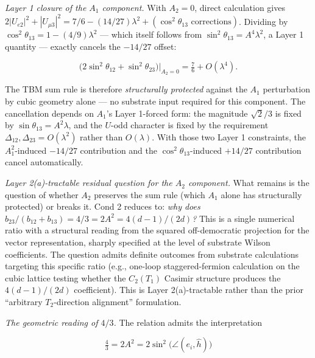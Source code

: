 \documentclass[
]{article}
\begin{document}
\emph{Layer 1 closure of the \(A_1\) component.} With \(A_2 = 0\),
direct calculation gives
\(2|U_{e2}|^2 + |U_{\mu 3}|^2 = 7/6 - (14/27)\lambda^2 + (\cos^2\theta_{13}\text{ corrections})\).
Dividing by \(\cos^2\theta_{13} = 1 - (4/9)\lambda^2\) --- which itself
follows from \(\sin^2\theta_{13} = A^4\lambda^2\), a Layer 1 quantity
--- exactly cancels the \(-14/27\) offset:

\[\bigl(2\sin^2\theta_{12} + \sin^2\theta_{23}\bigr)\big|_{A_2=0} = \tfrac{7}{6} + O(\lambda^4).\]

The TBM sum rule is therefore \emph{structurally protected} against the
\(A_1\) perturbation by cubic geometry alone --- no substrate input
required for this component. The cancellation depends on \(A_1\)'s Layer
1-forced form: the magnitude \(\sqrt{2}/3\) is fixed by
\(\sin\theta_{13} = A^2\lambda\), and the \(U\)-odd character is fixed
by the requirement \(\Delta_{12}, \Delta_{23} = O(\lambda^2)\) rather
than \(O(\lambda)\). With those two Layer 1 constraints, the
\(A_1^2\)-induced \(-14/27\) contribution and the
\(\cos^2\theta_{13}\)-induced \(+14/27\) contribution cancel
automatically.

\emph{Layer 2(a)-tractable residual question for the \(A_2\) component.}
What remains is the question of whether \(A_2\) preserves the sum rule
(which \(A_1\) alone has structurally protected) or breaks it. Cond 2
reduces to: \emph{why does
\(b_{23}/(b_{12}+b_{13}) = 4/3 = 2A^2 = 4(d-1)/(2d)\)?} This is a single
numerical ratio with a structural reading from the squared
off-democratic projection for the vector representation, sharply
specified at the level of substrate Wilson coefficients. The question
admits definite outcomes from substrate calculations targeting this
specific ratio (e.g., one-loop staggered-fermion calculation on the
cubic lattice testing whether the \(C_2(T_1)\) Casimir structure
produces the \(4(d-1)/(2d)\) coefficient). This is Layer 2(a)-tractable
rather than the prior ``arbitrary \(T_2\)-direction alignment''
formulation.

\emph{The geometric reading of \(4/3\).} The relation admits the
interpretation

\[\tfrac{4}{3} = 2A^2 = 2\sin^2\!\bigl(\angle(e_i, \hat{h})\bigr)\]
\end{document}
